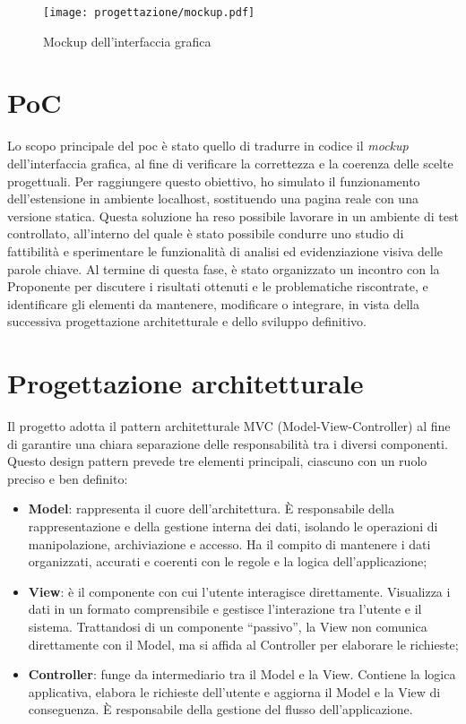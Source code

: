 \begin{figure}[H]
    \centering 
    \texttt{[image: progettazione/mockup.pdf]} 
    \caption{Mockup dell'interfaccia grafica}
\end{figure}

\section{PoC}
\label{sec:poc}

\par Lo scopo principale del \gls{poc} è stato quello di tradurre in codice il \textit{mockup} dell’interfaccia grafica, al fine di verificare la correttezza e la coerenza delle scelte progettuali. Per raggiungere questo obiettivo, ho simulato il funzionamento dell’estensione in ambiente \gls{localhost}, sostituendo una pagina reale con una versione statica. Questa soluzione ha reso possibile lavorare in un ambiente di test controllato, all’interno del quale è stato possibile condurre uno studio di fattibilità e sperimentare le funzionalità di analisi ed evidenziazione visiva delle parole chiave. Al termine di questa fase, è stato organizzato un incontro con la Proponente per discutere i risultati ottenuti e le problematiche riscontrate, e identificare gli elementi da mantenere, modificare o integrare, in vista della successiva progettazione architetturale e dello sviluppo definitivo.

\section{Progettazione architetturale}
\label{sec:progettazione}

\par Il progetto adotta il pattern architetturale MVC (Model-View-Controller) al fine di garantire una chiara separazione delle responsabilità tra i diversi componenti. Questo design pattern prevede tre elementi principali, ciascuno con un ruolo preciso e ben definito:
\begin{itemize}
  \item \textbf{Model}: rappresenta il cuore dell’architettura. È responsabile della rappresentazione e della gestione interna dei dati, isolando le operazioni di manipolazione, archiviazione e accesso. Ha il compito di mantenere i dati organizzati, accurati e coerenti con le regole e la logica dell’applicazione;
  \item \textbf{View}: è il componente con cui l’utente interagisce direttamente. Visualizza i dati in un formato comprensibile e gestisce l’interazione tra l’utente e il sistema. Trattandosi di un componente “passivo”, la View non comunica direttamente con il Model, ma si affida al Controller per elaborare le richieste;
  \item \textbf{Controller}: funge da intermediario tra il Model e la View. Contiene la logica applicativa, elabora le richieste dell’utente e aggiorna il Model e la View di conseguenza. È responsabile della gestione del flusso dell’applicazione.
\end{itemize}

